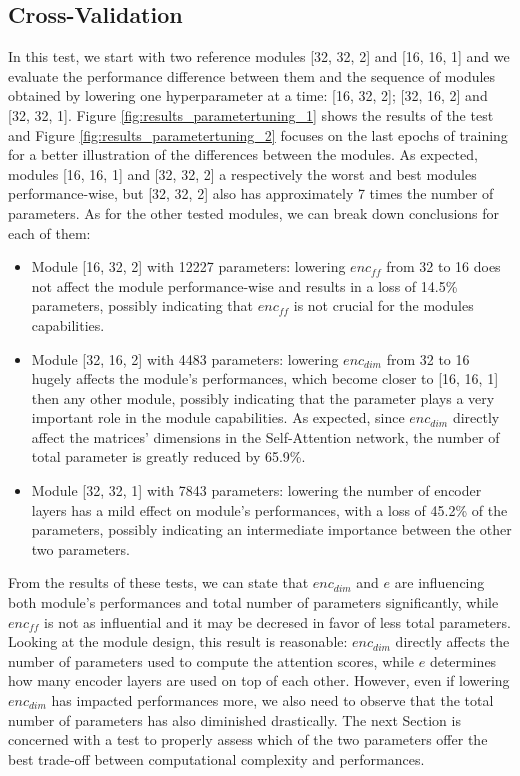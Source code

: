         \subsection{Cross-Validation}
            In this test, we start with two reference modules [32, 32, 2] and [16, 16, 1] and we evaluate the performance difference between them and the sequence of modules obtained by lowering one hyperparameter at a time: [16, 32, 2]; [32, 16, 2] and [32, 32, 1]. Figure \ref{fig:results_parametertuning_1} shows the results of the test and Figure \ref{fig:results_parametertuning_2} focuses on the last epochs of training for a better illustration of the differences between the modules. \newline
            As expected, modules [16, 16, 1] and [32, 32, 2] a respectively the worst and best modules performance-wise, but [32, 32, 2] also has approximately 7 times the number of parameters. As for the other tested modules, we can break down conclusions for each of them:
            \begin{itemize}
                \item Module [16, 32, 2] with 12227 parameters: lowering $enc_{ff}$ from 32 to 16 does not affect the module performance-wise and results in a loss of 14.5\% parameters, possibly indicating that $enc_{ff}$ is not crucial for the modules capabilities.
                \item Module [32, 16, 2] with 4483 parameters: lowering $enc_{dim}$ from 32 to 16 hugely affects the module's performances, which become closer to [16, 16, 1] then any other module, possibly indicating that the parameter plays a very important role in the module capabilities. As expected, since $enc_{dim}$ directly affect the matrices' dimensions in the Self-Attention network, the number of total parameter is greatly reduced by 65.9\%.
                \item Module [32, 32, 1] with 7843 parameters: lowering the number of encoder layers has a mild effect on module's performances, with a loss of 45.2\% of the parameters, possibly indicating an intermediate importance between the other two parameters.
            \end{itemize}
            
            From the results of these tests, we can state that $enc_{dim}$ and $e$ are influencing both module's performances and total number of parameters significantly, while $enc_{ff}$ is not as influential and it may be decresed in favor of less total parameters. Looking at the module design, this result is reasonable: $enc_{dim}$ directly affects the number of parameters used to compute the attention scores, while $e$ determines how many encoder layers are used on top of each other. However, even if lowering $enc_{dim}$ has impacted performances more, we also need to observe that the total number of parameters has also diminished drastically. The next Section is concerned with a test to properly assess which of the two parameters offer the best trade-off between computational complexity and performances.
        
